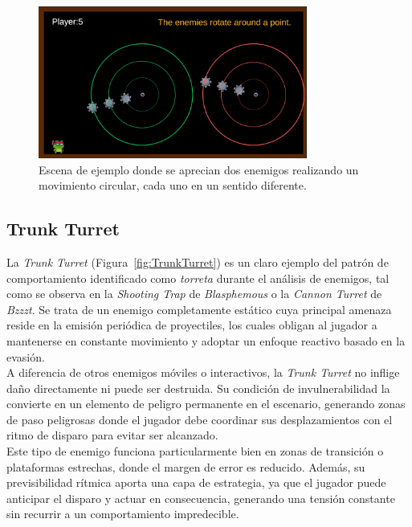 \begin{figure}[t]
	\centering
	\includegraphics[height=5cm]{Imagenes/SpinningRocks.png}
	\caption{Escena de ejemplo donde se aprecian dos enemigos realizando un movimiento circular, cada uno en un sentido diferente.}
	\label{fig:SpinningRocks}
\end{figure}

\subsection{Trunk Turret}

La \textit{Trunk Turret} (Figura~\ref{fig:TrunkTurret}) es un claro ejemplo del patrón de comportamiento identificado como \emph{torreta} durante el análisis de enemigos, tal como se observa en la \textit{Shooting Trap} de \textit{Blasphemous} o la \textit{Cannon Turret} de \textit{Bzzzt}. Se trata de un enemigo completamente estático cuya principal amenaza reside en la emisión periódica de proyectiles, los cuales obligan al jugador a mantenerse en constante movimiento y adoptar un enfoque reactivo basado en la evasión.\\

A diferencia de otros enemigos móviles o interactivos, la \textit{Trunk Turret} no inflige daño directamente ni puede ser destruida. Su condición de invulnerabilidad la convierte en un elemento de peligro permanente en el escenario, generando zonas de paso peligrosas donde el jugador debe coordinar sus desplazamientos con el ritmo de disparo para evitar ser alcanzado.\\

Este tipo de enemigo funciona particularmente bien en zonas de transición o plataformas estrechas, donde el margen de error es reducido. Además, su previsibilidad rítmica aporta una capa de estrategia, ya que el jugador puede anticipar el disparo y actuar en consecuencia, generando una tensión constante sin recurrir a un comportamiento impredecible.\\

